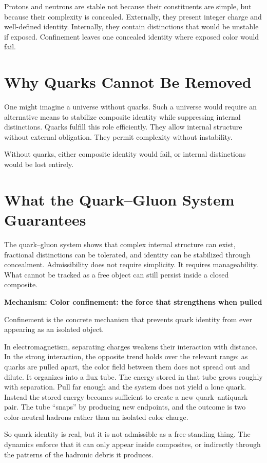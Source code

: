 \documentclass[11pt,twoside,openright]{book}
\newenvironment{mechanismbox}[1]
  {\begin{framed}\noindent\textbf{Mechanism: #1}\par\medskip}
  {\end{framed}}
\begin{document}
Protons and neutrons are stable not because their constituents are simple, but because their complexity is concealed. Externally, they present integer charge and well-defined identity. Internally, they contain distinctions that would be unstable if exposed. Confinement leaves one concealed identity where exposed color would fail.

\section*{Why Quarks Cannot Be Removed}

One might imagine a universe without quarks. Such a universe would require an alternative means to stabilize composite identity while suppressing internal distinctions. Quarks fulfill this role efficiently. They allow internal structure without external obligation. They permit complexity without instability.

Without quarks, either composite identity would fail, or internal distinctions would be lost entirely.

\section*{What the Quark--Gluon System Guarantees}

The quark--gluon system shows that complex internal structure can exist, fractional distinctions can be tolerated, and identity can be stabilized through concealment. Admissibility does not require simplicity. It requires manageability. What cannot be tracked as a free object can still persist inside a closed composite.

\begin{mechanismbox}{Color confinement: the force that strengthens when pulled}
Confinement is the concrete mechanism that prevents quark identity from ever appearing as an isolated object.

In electromagnetism, separating charges weakens their interaction with distance. In the strong interaction, the opposite trend holds over the relevant range: as quarks are pulled apart, the color field between them does not spread out and dilute. It organizes into a flux tube. The energy stored in that tube grows roughly with separation. Pull far enough and the system does not yield a lone quark. Instead the stored energy becomes sufficient to create a new quark--antiquark pair. The tube ``snaps'' by producing new endpoints, and the outcome is two color-neutral hadrons rather than an isolated color charge.

So quark identity is real, but it is not admissible as a free-standing thing.
The dynamics enforce that it can only appear inside composites, or indirectly through the patterns of the hadronic debris it produces.
\end{mechanismbox}
\end{document}
